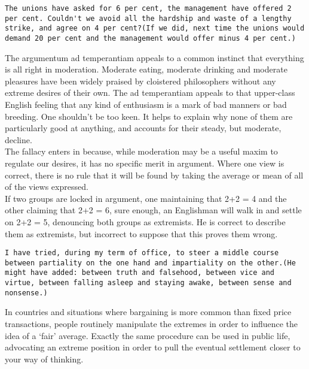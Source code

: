 \documentclass[a4paper,12pt,single,pdftex]{scrartcl}
\begin{document}
    \begin{verbatim}The unions have asked for 6 per cent, the management have offered 2 per cent. Couldn't we avoid all the hardship and waste of a lengthy strike, and agree on 4 per cent?(If we did, next time the unions would demand 20 per cent and the management would offer minus 4 per cent.)\end{verbatim}
    
      The argumentum ad temperantiam appeals to a common instinct that everything is all right in moderation. Moderate eating, moderate drinking and moderate pleasures have been widely praised by cloistered philosophers without any extreme desires of their own. The ad temperantiam appeals to that upper-class English feeling that any kind of enthusiasm is a mark of bad manners or bad breeding. One shouldn’t be too keen. It helps to explain why none of them are particularly good at anything, and accounts for their steady, but moderate, decline.
    \\

    
      The fallacy enters in because, while moderation may be a useful maxim to regulate our desires, it has no specific merit in argument. Where one view is correct, there is no rule that it will be found by taking the average or mean of all of the views expressed.
    \\

    
      If two groups are locked in argument, one maintaining that 2+2 = 4 and the other claiming that 2+2 = 6, sure enough, an Englishman will walk in and settle on 2+2 = 5, denouncing both groups as extremists. He is correct to describe them as extremists, but incorrect to suppose that this proves them wrong.
    \\

    \begin{verbatim}I have tried, during my term of office, to steer a middle course between partiality on the one hand and impartiality on the other.(He might have added: between truth and falsehood, between vice and virtue, between falling asleep and staying awake, between sense and nonsense.)\end{verbatim}
    
      In countries and situations where bargaining is more common than fixed price transactions, people routinely manipulate the extremes in order to influence the idea of a ‘fair’ average. Exactly the same procedure can be used in public life, advocating an extreme position in order to pull the eventual settlement closer to your way of thinking.
    \\
\end{document}
